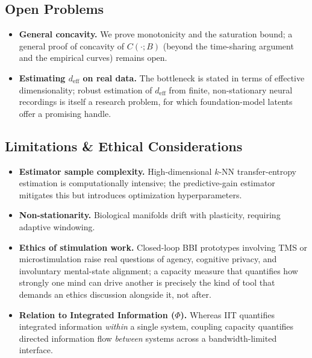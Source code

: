 \documentclass[11pt]{article}
\begin{document}
\subsection{Open Problems}
\begin{itemize}[leftmargin=1.2em]
    \item \textbf{General concavity.} We prove monotonicity and the saturation bound; a general proof of concavity of $C(\cdot;B)$ (beyond the time-sharing argument and the empirical curves) remains open.
    \item \textbf{Estimating $d_{\mathrm{eff}}$ on real data.} The bottleneck is stated in terms of effective dimensionality; robust estimation of $d_{\mathrm{eff}}$ from finite, non-stationary neural recordings is itself a research problem, for which foundation-model latents offer a promising handle.
\end{itemize}

\subsection{Limitations \& Ethical Considerations}
\begin{itemize}[leftmargin=1.2em]
    \item \textbf{Estimator sample complexity.} High-dimensional $k$-NN transfer-entropy estimation is computationally intensive; the predictive-gain estimator mitigates this but introduces optimization hyperparameters.
    \item \textbf{Non-stationarity.} Biological manifolds drift with plasticity, requiring adaptive windowing.
    \item \textbf{Ethics of stimulation work.} Closed-loop BBI prototypes involving TMS or microstimulation raise real questions of agency, cognitive privacy, and involuntary mental-state alignment; a capacity measure that quantifies how strongly one mind can drive another is precisely the kind of tool that demands an ethics discussion alongside it, not after.
    \item \textbf{Relation to Integrated Information ($\Phi$).} Whereas IIT quantifies integrated information \emph{within} a single system, coupling capacity quantifies directed information flow \emph{between} systems across a bandwidth-limited interface.
\end{itemize}
\end{document}
